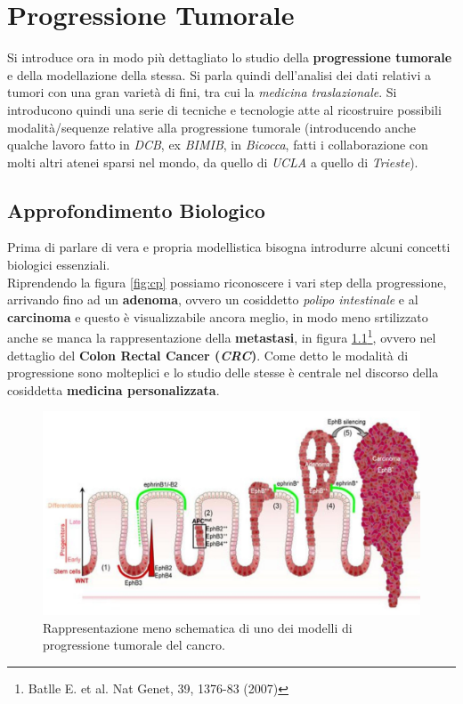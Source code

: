 \documentclass[a4paper,12pt, oneside]{book}
\begin{document}
\chapter{Progressione Tumorale}
Si introduce ora in modo più dettagliato lo studio della \textbf{progressione
  tumorale} e della modellazione della stessa. Si parla quindi dell'analisi dei
dati relativi a tumori con una gran varietà di fini, tra cui la \textit{medicina
  traslazionale}. Si introducono quindi una serie di tecniche e tecnologie atte
al ricostruire possibili modalità/sequenze relative alla progressione
tumorale (introducendo anche qualche lavoro fatto in \textit{DCB}, ex
\textit{BIMIB}, in \textit{Bicocca}, fatti i collaborazione con molti altri
atenei sparsi nel mondo, da quello di \textit{UCLA} a quello di
\textit{Trieste}).
\section{Approfondimento Biologico}
Prima di parlare di vera e propria modellistica bisogna introdurre alcuni
concetti biologici essenziali.\\
Riprendendo la figura \ref{fig:cp} possiamo riconoscere i vari step della
progressione, arrivando fino ad un \textbf{adenoma}, ovvero un cosiddetto
\textit{polipo intestinale} e al \textbf{carcinoma} e questo è visualizzabile
ancora meglio, in modo meno srtilizzato anche se manca la rappresentazione della
\textbf{metastasi}, in figura \ref{fig:cp2}\footnote{Batlle E. et al. Nat Genet,
  39, 1376-83 (2007)}, ovvero nel dettaglio del \textbf{Colon Rectal Cancer
  (\textit{CRC})}. Come detto le modalità di progressione sono molteplici e
lo studio delle stesse è centrale nel discorso della cosiddetta \textbf{medicina
  personalizzata}.  
\begin{figure}
  \centering
  \includegraphics[scale = 0.2]{img/cp2.jpg}
  \caption{Rappresentazione meno schematica di uno dei modelli di progressione
    tumorale del cancro.}  
  \label{fig:cp2}
\end{figure}
\end{document}
